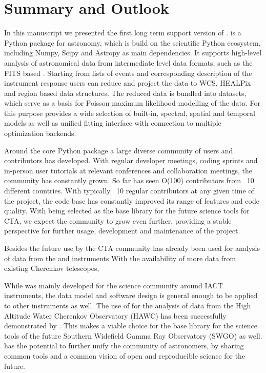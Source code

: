 \section{Summary and Outlook}
\label{sec:summary-and-outlook}

In this manuscript we presented the first long term support  version of \gammapy.
\gammapy is a Python package for \gammaray astronomy, which is build on the
scientific Python ecosystem, including Numpy, Scipy and Astropy as
main dependencies. It supports high-level analysis of astronomical \gammaray
data from intermediate level data formats, such as the FITS based
\gadf. Starting from lists of \gammaray events and corresponding description
of the instrument response users can reduce and project the data
to WCS, HEALPix and region based data structures. The reduced data is bundled
into datasets, which serve as a basis for Poisson maximum likelihood
modelling of the data. For this purpose \gammapy provides a wide selection
of built-in, spectral, spatial and temporal models as well as unified
fitting interface with connection to multiple optimization backends.

Around the core Python package a large diverse community of
users and contributors has developed. With regular developer meetings,
coding sprints and in-person user tutorials at relevant conferences
and collaboration meetings, the community has constantly grown.
So far \gammapy has seen O(100) contributors from ~10 different countries.
With typically ~10 regular contributors at any given time of the
project, the code base has constantly improved its range of features
and code quality. With \gammapy being selected as the base library
for the future science tools for CTA, we expect the community to grow
even further, providing a stable perspective for further usage,
development and maintenance of the project.

Besides the future use by the CTA community \gammapy has already
been used for analysis of data from the \hess and \magic instruments
With the availability of more \gammaray data from existing Cherenkov
telescopes, \gammaray

While \gammapy was mainly developed for the science community around
IACT instruments, the data model and software design is general
enough to be applied to other \gammaray instruments as well.
The use of \gammapy for the analysis of data from the High Altitude
Water Cherenkov Observatory (HAWC) has been successfully
demonstrated by . This makes \gammapy
a viable choice for the base library for the science tools
of the future Southern Widefield Gamma Ray Observatory
(SWGO) as well. \gammapy has the potential to further unify the community
of \gammaray astronomers, by sharing common tools and
a common vision of open and reproducible science for the future.
